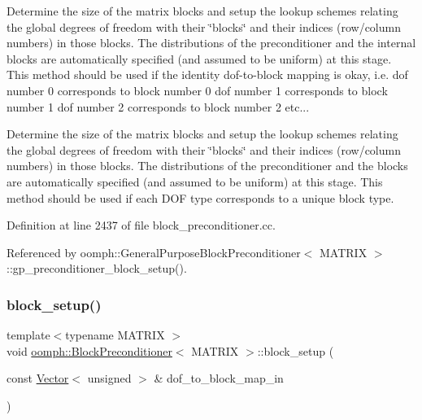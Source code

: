 Determine the size of the matrix blocks and setup the lookup schemes relating the global degrees of freedom with their \char`\"{}blocks\char`\"{} and their indices (row/column numbers) in those blocks. The distributions of the preconditioner and the internal blocks are automatically specified (and assumed to be uniform) at this stage. This method should be used if the identity dof-\/to-\/block mapping is okay, i.\+e. dof number 0 corresponds to block number 0 dof number 1 corresponds to block number 1 dof number 2 corresponds to block number 2 etc... 

Determine the size of the matrix blocks and setup the lookup schemes relating the global degrees of freedom with their \char`\"{}blocks\char`\"{} and their indices (row/column numbers) in those blocks. The distributions of the preconditioner and the blocks are automatically specified (and assumed to be uniform) at this stage. This method should be used if each D\+OF type corresponds to a unique block type. 

Definition at line 2437 of file block\+\_\+preconditioner.\+cc.



Referenced by oomph\+::\+General\+Purpose\+Block\+Preconditioner$<$ M\+A\+T\+R\+I\+X $>$\+::gp\+\_\+preconditioner\+\_\+block\+\_\+setup().

\mbox{\label{classoomph_1_1BlockPreconditioner_a6b70b51b533002ff33a09013aa084e54}} 
\subsubsection{\texorpdfstring{block\+\_\+setup()}{block\_setup()}\hspace{0.1cm}{\footnotesize\ttfamily [2/2]}}
{\footnotesize\ttfamily template$<$typename M\+A\+T\+R\+IX $>$ \\
void \hyperlink{classoomph_1_1BlockPreconditioner}{oomph\+::\+Block\+Preconditioner}$<$ M\+A\+T\+R\+IX $>$\+::block\+\_\+setup (\begin{DoxyParamCaption}\item[{const \hyperlink{classoomph_1_1Vector}{Vector}$<$ unsigned $>$ \&}]{dof\+\_\+to\+\_\+block\+\_\+map\+\_\+in }\end{DoxyParamCaption})}



